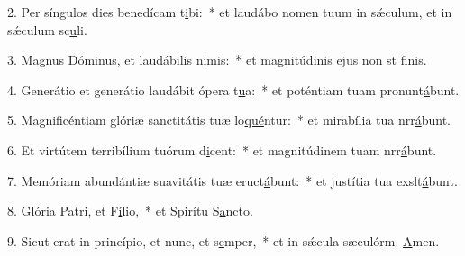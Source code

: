 2. Per síngulos dies benedícam t\uline{i}bi:~* et laudábo nomen tuum in sǽculum, et in sǽculum sc\uline{u}li.\par 
3. Magnus Dóminus, et laudábilis n\uline{i}mis:~* et magnitúdinis ejus non st f\uline{i}nis.\par 
4. Generátio et generátio laudábit ópera t\uline{u}a:~* et poténtiam tuam pronunt\uline{á}bunt.\par 
5. Magnificéntiam glóriæ sanctitátis tuæ lo\uline{qué}ntur:~* et mirabília tua nrr\uline{á}bunt.\par 
6. Et virtútem terribílium tuórum d\uline{i}cent:~* et magnitúdinem tuam nrr\uline{á}bunt.\par 
7. Memóriam abundántiæ suavitátis tuæ eruct\uline{á}bunt:~* et justítia tua exslt\uline{á}bunt.\par 
8. Glória Patri, et F\uline{í}lio,~* et Spirítu S\uline{a}ncto.\par 
9. Sicut erat in princípio, et nunc, et s\uline{e}mper,~* et in sǽcula sæculórm. \uline{A}men.\par 
